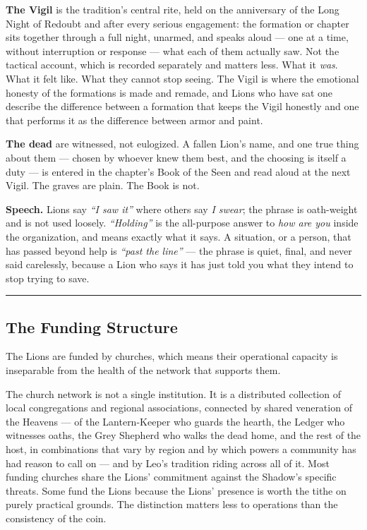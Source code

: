 \textbf{The Vigil} is the tradition's central rite, held on the anniversary of the Long Night of Redoubt and after every serious engagement: the formation or chapter sits together through a full night, unarmed, and speaks aloud --- one at a time, without interruption or response --- what each of them actually saw. Not the tactical account, which is recorded separately and matters less. What it \textit{was}. What it felt like. What they cannot stop seeing. The Vigil is where the emotional honesty of the formations is made and remade, and Lions who have sat one describe the difference between a formation that keeps the Vigil honestly and one that performs it as the difference between armor and paint.

\textbf{The dead} are witnessed, not eulogized. A fallen Lion's name, and one true thing about them --- chosen by whoever knew them best, and the choosing is itself a duty --- is entered in the chapter's Book of the Seen and read aloud at the next Vigil. The graves are plain. The Book is not.

\textbf{Speech.} Lions say \textit{``I saw it''} where others say \textit{I swear}; the phrase is oath-weight and is not used loosely. \textit{``Holding''} is the all-purpose answer to \textit{how are you} inside the organization, and means exactly what it says. A situation, or a person, that has passed beyond help is \textit{``past the line''} --- the phrase is quiet, final, and never said carelessly, because a Lion who says it has just told you what they intend to stop trying to save.

\medskip\hrule\medskip

\subsection{The Funding Structure}

The Lions are funded by churches, which means their operational capacity is inseparable from the health of the network that supports them.

The church network is not a single institution. It is a distributed collection of local congregations and regional associations, connected by shared veneration of the Heavens --- of the Lantern-Keeper who guards the hearth, the Ledger who witnesses oaths, the Grey Shepherd who walks the dead home, and the rest of the host, in combinations that vary by region and by which powers a community has had reason to call on --- and by Leo's tradition riding across all of it. Most funding churches share the Lions' commitment against the Shadow's specific threats. Some fund the Lions because the Lions' presence is worth the tithe on purely practical grounds. The distinction matters less to operations than the consistency of the coin.


